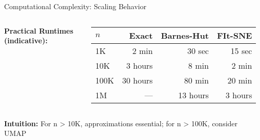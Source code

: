 \documentclass[aspectratio=169]{beamer}
\newcommand{\intuition}[1]{\colorbox{green!10}{\textcolor{intuitioncolor}{\textbf{Intuition:} #1}}}
\begin{document}
\begin{frame}{Computational Complexity: Scaling Behavior}
\begin{columns}

\vspace{0.2cm}
\textbf{Practical Runtimes (indicative):}

\begin{tabular}{l|r|r|r}
$n$ & Exact & Barnes-Hut & FIt-SNE\\
\hline
1K & 2 min & 30 sec & 15 sec\\
10K & 3 hours & 8 min & 2 min\\
100K & 30 hours & 80 min & 20 min\\
1M & — & 13 hours & 3 hours
\end{tabular}
\end{columns}

\vspace{0.3cm}
\intuition{For n > 10K, approximations essential; for n > 100K, consider UMAP}
\end{frame}
\end{document}
